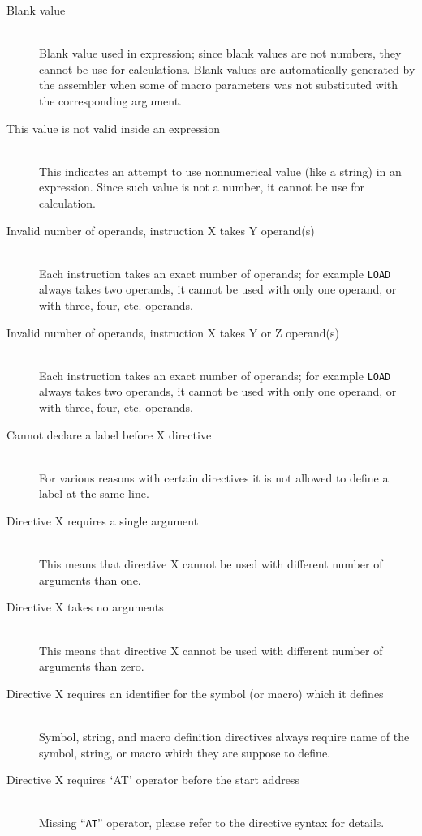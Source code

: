 \begin{description}
        \item[Blank value]~\\
            Blank value used in expression; since blank values are not numbers, they cannot be use for calculations. Blank values are automatically generated by the assembler when some of macro parameters was not substituted with the corresponding argument.
        \item[This value is not valid inside an expression]~\\
            This indicates an attempt to use nonnumerical value (like a string) in an expression. Since such value is not a number, it cannot be use for calculation.
        \item[Invalid number of operands, instruction X takes Y operand(s)]~\\
            Each instruction takes an exact number of operands; for example \texttt{LOAD} always takes two operands, it cannot be used with only one operand, or with three, four, etc. operands.
        \item[Invalid number of operands, instruction X takes Y or Z operand(s)]~\\
            Each instruction takes an exact number of operands; for example \texttt{LOAD} always takes two operands, it cannot be used with only one operand, or with three, four, etc. operands.
        \item[Cannot declare a label before X directive]~\\
            For various reasons with certain directives it is not allowed to define a label at the same line.
        \item[Directive X requires a single argument]~\\
            This means that directive X cannot be used with different number of arguments than one.
        \item[Directive X takes no arguments]~\\
            This means that directive X cannot be used with different number of arguments than zero.
        \item[Directive X requires an identifier for the symbol (or macro) which it defines]~\\
            Symbol, string, and macro definition directives always require name of the symbol, string, or macro which they are suppose to define.
        \item[Directive X requires `AT' operator before the start address]~\\
            Missing ``\texttt{AT}'' operator, please refer to the directive syntax for details.

\end{description}
